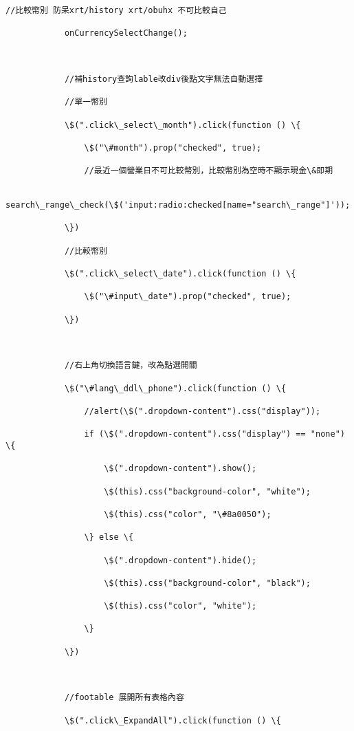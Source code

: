 \documentclass[11pt]{article}
\begin{document}
\begin{Verbatim}[commandchars=\\\{\}]
            //比較幣別 防呆xrt/history xrt/obuhx 不可比較自己

            onCurrencySelectChange();



            //補history查詢lable改div後點文字無法自動選擇

            //單一幣別

            \$(".click\_select\_month").click(function () \{

                \$("\#month").prop("checked", true);

                //最近一個營業日不可比較幣別，比較幣別為空時不顯示現金\&即期

                search\_range\_check(\$('input:radio:checked[name="search\_range"]'));

            \})

            //比較幣別

            \$(".click\_select\_date").click(function () \{

                \$("\#input\_date").prop("checked", true);

            \})



            //右上角切換語言鍵，改為點選開關

            \$("\#lang\_ddl\_phone").click(function () \{

                //alert(\$(".dropdown-content").css("display"));

                if (\$(".dropdown-content").css("display") == "none") \{

                    \$(".dropdown-content").show();

                    \$(this).css("background-color", "white");

                    \$(this).css("color", "\#8a0050");

                \} else \{

                    \$(".dropdown-content").hide();

                    \$(this).css("background-color", "black");

                    \$(this).css("color", "white");

                \}

            \})



            //footable 展開所有表格內容

            \$(".click\_ExpandAll").click(function () \{


\end{Verbatim}
\end{document}
